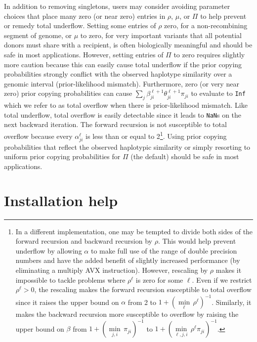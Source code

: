 \documentclass[a4paper]{article}
\begin{document}
In addition to removing singletons, users may consider avoiding parameter choices that place many zero (or near zero) entries in \(\rho\), \(\mu\), or \(\Pi\) to help prevent or remedy total underflow.
Setting some entries of \(\rho\) zero, for a non-recombining segment of genome, or \(\mu\) to zero, for very important variants that all potential donors must share with a recipient, is often biologically meaningful and should be safe in most applications.
However, setting entries of \(\Pi\) to zero requires slightly more caution because this can easily cause total underflow if the prior copying probabilities strongly conflict with the observed haplotype similarity over a genomic interval (prior-likelihood mismatch).
Furthermore, zero (or very near zero) prior copying probabilities can cause \(\underset{j}{\sum} \beta_{ji}^{\ell+1}\theta_{ji}^{\ell+1} \pi_{ji}\) to evaluate to \texttt{Inf} which we refer to as total overflow when there is prior-likelihood mismatch.
Like total underflow, total overflow is easily detectable since it leads to \texttt{NaN}s on the next backward iteration.
The forward recursion is not susceptible to total overflow because every \(\alpha_{ji}^\ell\) is less than or equal to 2\footnote[2]{
  In a different implementation, one may be tempted to divide both sides of the forward recursion and backward recursion by \(\rho\).
  This would help prevent underflow by allowing \(\alpha\) to make full use of the range of double precision numbers and have the added benefit of slightly increased performance (by eliminating a multiply AVX instruction).
  However, rescaling by \(\rho\) makes it impossible to tackle problems where \(\rho^\ell\) is zero for some \(\ell\).
  Even if we restrict \(\rho^\ell > 0\), the rescaling makes the forward recursion susceptible to total overflow since it raises the upper bound on \(\alpha\) from 2 to \(1 + \left( \underset{\ell}{\min}\,\rho^\ell \right)^{-1}\).
	Similarly, it makes the backward recursion more susceptible to overflow by raising the upper bound on \(\beta\) from \(1 + \left( \underset{j,i}{\min}\,\pi_{ji} \right)^{-1}\) to \(1 + \left( \underset{\ell,j,i}{\min}\,\rho^\ell \pi_{ji} \right)^{-1}\).}.
Using prior copying probabilities that reflect the observed haplotypic similarity or simply resorting to uniform prior copying probabilities for \(\Pi\) (the default) should be safe in most applications.



\section{Installation help}
\label{installation-help}
\end{document}
